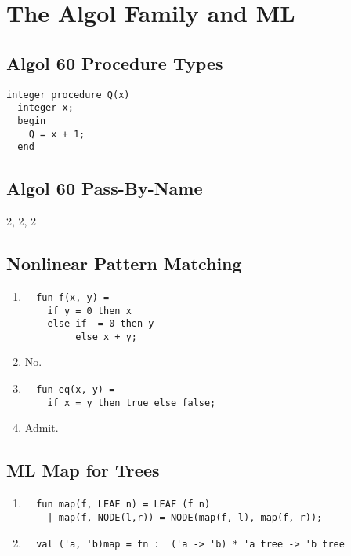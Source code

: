 \chapter{The Algol Family and ML}

\section{Algol 60 Procedure Types}
\begin{verbatim}
integer procedure Q(x)
  integer x;
  begin
    Q = x + 1;
  end
\end{verbatim}


\section{Algol 60 Pass-By-Name}
2, 2, 2


\section{Nonlinear Pattern Matching}
\begin{enumerate}
  \item
\begin{verbatim}
  fun f(x, y) =
    if y = 0 then x
    else if  = 0 then y
         else x + y;
\end{verbatim}
  
  \item No.
  
  \item 
\begin{verbatim}
  fun eq(x, y) = 
    if x = y then true else false;
\end{verbatim}
  
  \item Admit.
\end{enumerate}


\section{ML Map for Trees}
\begin{enumerate}
  \item 
\begin{verbatim}
  fun map(f, LEAF n) = LEAF (f n)
    | map(f, NODE(l,r)) = NODE(map(f, l), map(f, r));
\end{verbatim}
  
  \item
\begin{verbatim}
  val ('a, 'b)map = fn :  ('a -> 'b) * 'a tree -> 'b tree
\end{verbatim}
\end{enumerate}


